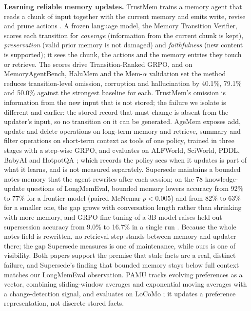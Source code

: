 \IfFileExists{IEEEtran.cls}{\documentclass[journal]{IEEEtran}\def\HAVEIEEE{1}}{\documentclass[10pt,twocolumn]{article}\usepackage[margin=0.7in,columnsep=0.25in]{geometry}}
\begin{document}
\textbf{Learning reliable memory updates.} TrustMem trains a memory agent that reads a chunk of input together with the current memory and emits write, revise and prune actions \cite{yang2026trustmem}. A frozen language model, the Memory Transition Verifier, scores each transition for \emph{coverage} (information from the current chunk is kept), \emph{preservation} (valid prior memory is not damaged) and \emph{faithfulness} (new content is supported); it sees the chunk, the actions and the memory entries they touch or retrieve. The scores drive Transition-Ranked GRPO, and on MemoryAgentBench, HaluMem and the Mem-$\alpha$ validation set the method reduces transition-level omission, corruption and hallucination by 40.1\%, 79.1\% and 50.0\% against the strongest baseline for each. TrustMem's omission is information from the new input that is not stored; the failure we isolate is different and earlier: the stored record that must change is absent from the updater's input, so no transition on it can be generated. AgeMem exposes add, update and delete operations on long-term memory and retrieve, summary and filter operations on short-term context as tools of one policy, trained in three stages with a step-wise GRPO, and evaluates on ALFWorld, SciWorld, PDDL, BabyAI and HotpotQA \cite{yu2026agemem}; which records the policy sees when it updates is part of what it learns, and is not measured separately. Supersede maintains a bounded notes memory that the agent rewrites after each session; on the 78 knowledge-update questions of LongMemEval, bounded memory lowers accuracy from 92\% to 77\% for a frontier model (paired McNemar $p<0.005$) and from 82\% to 63\% for a smaller one, the gap grows with conversation length rather than shrinking with more memory, and GRPO fine-tuning of a 3B model raises held-out supersession accuracy from 9.0\% to 16.7\% in a single run \cite{patel2026supersede}. Because the whole notes field is rewritten, no retrieval step stands between memory and updater there; the gap Supersede measures is one of maintenance, while ours is one of visibility. Both papers support the premise that stale facts are a real, distinct failure, and Supersede's finding that bounded memory stays below full context matches our LongMemEval observation. PAMU tracks evolving preferences as a vector, combining sliding-window averages and exponential moving averages with a change-detection signal, and evaluates on LoCoMo \cite{sun2026pamu}; it updates a preference representation, not discrete stored facts.
\end{document}
